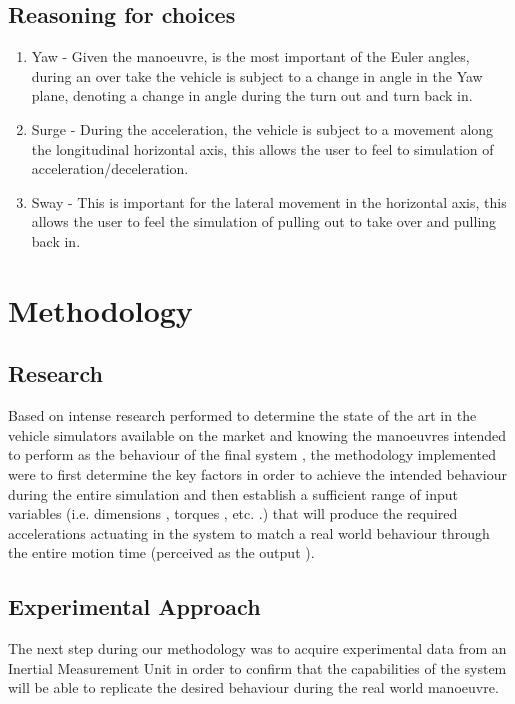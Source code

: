 \documentclass{article}
\begin{document}
\subsection{Reasoning for choices}
\begin{enumerate}
\item Yaw - Given the manoeuvre, is the most important of the Euler angles, during an over take the vehicle is subject to a change in angle in the Yaw plane, denoting a change in angle during the turn out and turn back in.
\item Surge - During the acceleration, the vehicle is subject to a movement along the longitudinal horizontal axis, this allows the user to feel to simulation of acceleration/deceleration.  
\item Sway - This is important for the lateral movement in the horizontal axis,  this allows the user to feel the simulation of pulling out to take over and pulling back in. 
\end{enumerate}
\section{Methodology}
\subsection{Research}
Based on intense research performed to determine the state of the art in the vehicle simulators available on the market and knowing the manoeuvres intended to perform as the behaviour of the final system , the methodology implemented were to first determine the key factors in order to achieve the intended behaviour during the entire simulation and then establish a sufficient range of input variables (i.e. dimensions , torques , etc. .) that will produce the required accelerations actuating in the system to match a real world behaviour through the entire motion time (perceived as the output ).

\subsection{Experimental Approach}
The next step during our methodology was to acquire experimental data from an Inertial Measurement Unit in order to confirm that the capabilities of the system will be able to replicate the desired behaviour during the real world manoeuvre.
\end{document}
